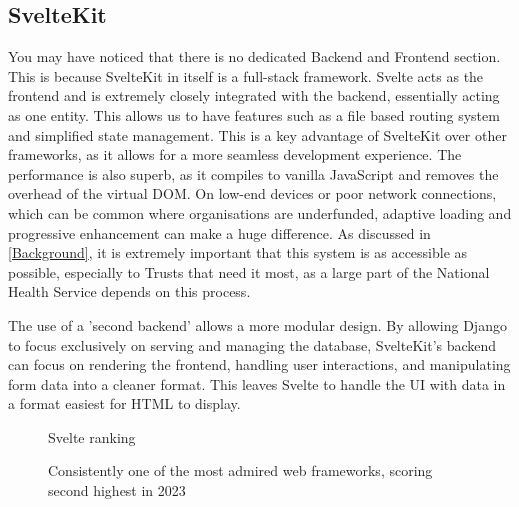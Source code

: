 \subsection{SvelteKit} \label{SvelteKit}
You may have noticed that there is no dedicated Backend and Frontend section. This is because SvelteKit in itself is a full-stack framework. Svelte acts as the frontend and is extremely closely integrated with the backend, essentially acting as one entity. This allows us to have features such as a file based routing system and simplified state management. This is a key advantage of SvelteKit over other frameworks, as it allows for a more seamless development experience. The performance is also superb, as it compiles to vanilla JavaScript and removes the overhead of the virtual DOM. On low-end devices or poor network connections, which can be common where organisations are underfunded, adaptive loading and progressive enhancement can make a huge difference. As discussed in \ref{Background}, it is extremely important that this system is as accessible as possible, especially to Trusts that need it most, as a large part of the National Health Service depends on this process. 

The use of a 'second backend' allows a more modular design. By allowing Django to focus exclusively on serving and managing the database, SvelteKit's backend can focus on rendering the frontend, handling user interactions, and manipulating form data into a cleaner format. This leaves Svelte to handle the UI with data in a format easiest for HTML to display. 

\begin{figure}[h]
\centering
{}
\caption{Svelte ranking}
\vspace{-10pt}
\caption*{Consistently one of the most admired web frameworks, scoring second highest in 2023}
\vspace{-10pt}
\caption*{\parencite{noauthor_stack_nodate}}
\label{fig:svelte}
\vspace{-5pt}
\end{figure}

